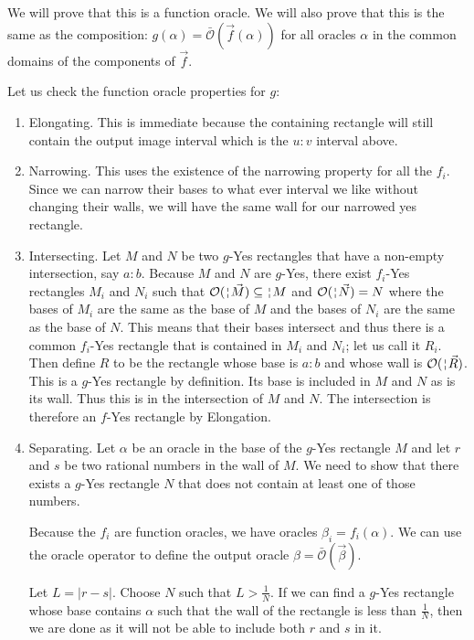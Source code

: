 \documentclass[12pt]{article}
\begin{document}
We will prove that this is a function oracle. We will also prove that this is the same as the composition: $g(\alpha) = \bar{\mathcal{O}}(\vec{f}(\alpha))$ for all oracles $\alpha$ in the common domains of the components of $\vec{f}$. 

Let us check the function oracle properties for $g$: 

\begin{enumerate} 

\item Elongating. This is immediate because the containing rectangle will still contain the output image interval which is the $u:v$ interval above.  

\item Narrowing. This uses the existence of the narrowing property for all the $f_i$. Since we can narrow their bases to what ever interval we like without changing their walls, we will have the same wall for our narrowed yes rectangle.  

\item Intersecting. Let $M$ and $N$ be two $g$-Yes rectangles that have a non-empty intersection, say $a:b$. Because $M$ and $N$ are $g$-Yes, there exist $f_i$-Yes rectangles $M_i$ and $N_i$ such that $\mathcal{O}(\wall{\vec{M}}) \subseteq \wall{M}$ and $\mathcal{O}(\wall{\vec{N}}) = N$ where the bases of $M_i$ are the same as the base of $M$ and the bases of $N_i$ are the same as the base of $N$. This means that their bases intersect and thus there is a common $f_i$-Yes rectangle that is contained in $M_i$ and $N_i$; let us call it $R_i$.  Then define $R$ to be the rectangle whose base is $a:b$ and whose wall is $\mathcal{O}(\wall{\vec{R}})$. This is a $g$-Yes rectangle by definition. Its base is included in $M$ and $N$ as is its wall. Thus this is in the intersection of $M$ and $N$. The intersection is therefore an $f$-Yes rectangle by Elongation.  

\item Separating. Let $\alpha$ be an oracle in the base of the $g$-Yes rectangle $M$ and let $r$ and $s$ be two rational numbers in the wall of $M$. We need to show that there exists a $g$-Yes rectangle $N$ that does not contain at least one of those numbers. 

Because the $f_i$ are function oracles, we have oracles $\beta_i = f_i(\alpha)$. We can use the oracle operator to define the output oracle $\beta = \bar{\mathcal{O}}(\vec{\beta})$. 

Let $L = |r-s|$. Choose $N$ such that $L > \frac{1}{N}$. If we can find a $g$-Yes rectangle whose base contains $\alpha$ such that the wall of the rectangle is less than $\frac{1}{N}$, then we are done as it will not be able to include both $r$ and $s$ in it. 


\end{enumerate}
\end{document}
